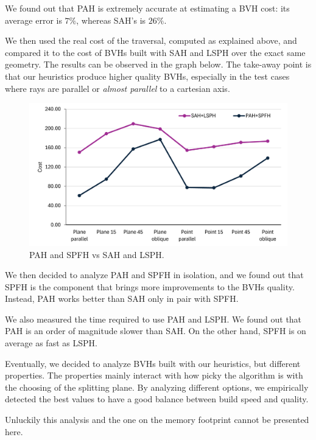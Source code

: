 \documentclass[11pt,a4paper,twocolumn]{article}
\begin{document}
We found out that PAH is extremely accurate at estimating a BVH cost: its average error is $7\%$, whereas SAH's is $26\%$.

We then used the real cost of the traversal, computed as explained above, and compared it to the cost of BVHs built with SAH and LSPH over the exact same geometry. The results can be observed in the graph below. The take-away point is that our heuristics produce higher quality BVHs, especially in the test cases where rays are parallel or \textit{almost parallel} to a cartesian axis.

\begin{figure}[H]
    \centering
    \includegraphics[width=\textwidth*\real{0.48}]{Images/pah_without_fallback_faster_chart.png}
    \caption{PAH and SPFH vs SAH and LSPH.}
    \label{fig:pah_without_fallback_faster_chart}
\end{figure}

We then decided to analyze PAH and SPFH in isolation, and we found out that SPFH is the component that brings more improvements to the BVHs quality. Instead, PAH works better than SAH only in pair with SPFH.

We also measured the time required to use PAH and LSPH. We found out that PAH is an order of magnitude slower than SAH. On the other hand, SPFH is on average as fast as LSPH.

Eventually, we decided to analyze BVHs built with our heuristics, but different properties. The properties mainly interact with how picky the algorithm is with the choosing of the splitting plane. By analyzing different options, we empirically detected the best values to have a good balance between build speed and quality. 

Unluckily this analysis and the one on the memory footprint cannot be presented here.
\end{document}
